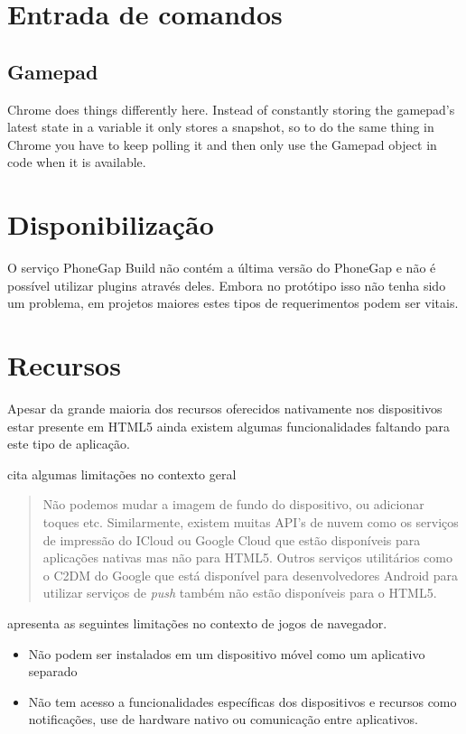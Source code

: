 \section{Entrada de comandos}

\subsection{Gamepad}
Chrome does things differently here. Instead of constantly storing the gamepad's latest state in a variable it only stores a snapshot, so to do the same thing in Chrome you have to keep polling it and then only use the Gamepad object in code when it is available.

\section{Disponibilização}

O serviço PhoneGap Build não contém a última versão do PhoneGap e
não é possível utilizar plugins através deles. Embora no protótipo
isso não tenha sido um problema, em projetos maiores estes tipos de
requerimentos podem ser vitais.

\section{Recursos}
Apesar da grande maioria dos recursos oferecidos nativamente
nos dispositivos estar presente em HTML5 ainda existem algumas
funcionalidades faltando para este tipo de aplicação.

\cite{html5Tradeoffs} cita algumas limitações no contexto geral
\begin{quote}
Não podemos mudar a imagem de fundo do dispositivo, ou adicionar toques
etc. Similarmente, existem muitas API's de nuvem como os serviços
de impressão do ICloud ou Google Cloud que estão disponíveis para
aplicações nativas mas não para HTML5. Outros serviços utilitários
como o C2DM do Google que está disponível para desenvolvedores Android
para utilizar serviços de \textit{push} também não estão disponíveis
para o HTML5.
\end{quote}

\cite{browserGamesTechnologyAndFuture} apresenta as seguintes limitações
no contexto de jogos de navegador.

\begin{itemize}
\item Não podem ser instalados em um dispositivo móvel como um aplicativo separado
\item Não tem acesso a funcionalidades específicas dos dispositivos e recursos como notificações, use de hardware nativo ou comunicação entre aplicativos.
\end{itemize}

